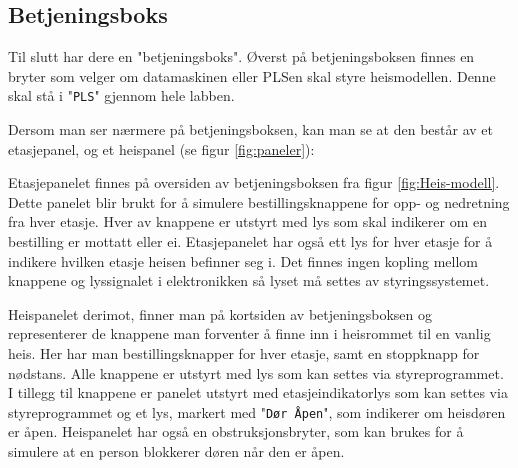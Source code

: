 \begin{alphasection}
\subsection{Betjeningsboks}
Til slutt har dere en "betjeningsboks". Øverst på betjeningsboksen finnes en bryter som velger om datamaskinen eller PLSen skal styre heismodellen. Denne skal stå i "\verb|PLS|" gjennom hele labben.



Dersom man ser nærmere på betjeningsboksen, kan man se at den består av et etasjepanel, og et heispanel (se figur \ref{fig:paneler}):

Etasjepanelet finnes på oversiden av betjeningsboksen fra figur \ref{fig:Heis-modell}. Dette panelet blir brukt for å simulere bestillingsknappene for opp- og nedretning fra hver etasje.  Hver av knappene er utstyrt med lys som skal indikerer om en bestilling er mottatt eller ei. Etasjepanelet har også ett lys for hver etasje for å indikere hvilken etasje heisen befinner seg i. Det finnes ingen kopling mellom knappene og lyssignalet i elektronikken så lyset må settes av styringssystemet.

Heispanelet derimot, finner man på kortsiden av betjeningsboksen og representerer de knappene man forventer å finne inn i heisrommet til en vanlig heis. Her har man bestillingsknapper for hver etasje, samt en stoppknapp for nødstans. Alle knappene er utstyrt med lys som kan settes via styreprogrammet. I tillegg til knappene er panelet utstyrt med etasjeindikatorlys som kan settes via styreprogrammet og et lys, markert med "\verb|Dør Åpen|", som indikerer om heisdøren er åpen. Heispanelet har også en obstruksjonsbryter, som kan brukes for å simulere at en person blokkerer døren når den er åpen.






\begin{figure}[ht!]
    \centering
    



\end{figure}
\end{alphasection}
